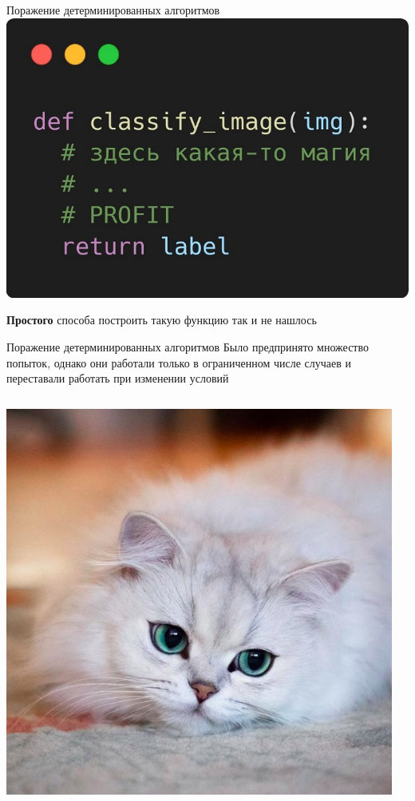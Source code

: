 \documentclass[aspectratio=169, professionalfonts]{beamer}
\begin{document}
\begin{frame}{Поражение детерминированных алгоритмов}
    \centering
    \includegraphics[width=.5\linewidth]{figures/fig9-clf-function.jpg}

    \textbf{Простого} способа построить такую функцию так и не нашлось
\end{frame}

\begin{frame}{Поражение детерминированных алгоритмов}
    Было предпринято множество попыток, однако они работали только в ограниченном
    числе случаев и переставали работать при изменении условий
    \vfill
    \begin{columns}
        \begin{column}{.25\linewidth}
            \includegraphics[width=\linewidth]{figures/fig7-cat.jpg}
        \end{column}
        \begin{column}{.15\linewidth}

\end{column}
\end{columns}
\end{frame}
\end{document}
